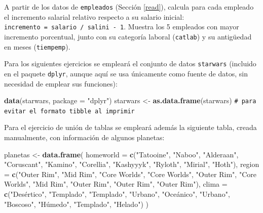 \documentclass[
]{book}
\newenvironment{Shaded}{\begin{snugshade}}{\end{snugshade}}
\newcommand{\AttributeTok}[1]{\textcolor[rgb]{0.13,0.29,0.53}{#1}}
\newcommand{\CommentTok}[1]{\textcolor[rgb]{0.56,0.35,0.01}{\textit{#1}}}
\newcommand{\FunctionTok}[1]{\textcolor[rgb]{0.13,0.29,0.53}{\textbf{#1}}}
\newcommand{\NormalTok}[1]{#1}
\newcommand{\OtherTok}[1]{\textcolor[rgb]{0.56,0.35,0.01}{#1}}
\newcommand{\StringTok}[1]{\textcolor[rgb]{0.31,0.60,0.02}{#1}}
\theoremstyle{break}
\theoremstyle{nonumberplain}
\renewcommand{\CommentTok}[1]{\textcolor[rgb]{0.41,0.41,0.41}{\texttt{#1}}}
\begin{document}
A partir de los datos de \texttt{empleados} (Sección \ref{read}), calcula para
cada empleado el incremento salarial relativo respecto a su salario inicial:
\texttt{incremento\ =\ salario\ /\ salini\ -\ 1}. Muestra los 5 empleados con mayor
incremento porcentual, junto con su categoría laboral (\texttt{catlab}) y su
antigüedad en meses (\texttt{tiempemp}).

Para los siguientes ejercicios se empleará el conjunto de datos \texttt{starwars}
(incluido en el paquete \texttt{dplyr}, aunque aquí se usa únicamente como fuente
de datos, sin necesidad de emplear sus funciones):

\begin{Shaded}
\begin{Highlighting}[]
\FunctionTok{data}\NormalTok{(starwars, }\AttributeTok{package =} \StringTok{"dplyr"}\NormalTok{)}
\NormalTok{starwars }\OtherTok{\textless{}{-}} \FunctionTok{as.data.frame}\NormalTok{(starwars) }\CommentTok{\# para evitar el formato tibble al imprimir}
\end{Highlighting}
\end{Shaded}

Para el ejercicio de unión de tablas se empleará además la siguiente tabla,
creada manualmente, con información de algunos planetas:

\begin{Shaded}
\begin{Highlighting}[]
\NormalTok{planetas }\OtherTok{\textless{}{-}} \FunctionTok{data.frame}\NormalTok{(}
  \AttributeTok{homeworld =} \FunctionTok{c}\NormalTok{(}\StringTok{"Tatooine"}\NormalTok{, }\StringTok{"Naboo"}\NormalTok{, }\StringTok{"Alderaan"}\NormalTok{, }\StringTok{"Coruscant"}\NormalTok{, }\StringTok{"Kamino"}\NormalTok{,}
                \StringTok{"Corellia"}\NormalTok{, }\StringTok{"Kashyyyk"}\NormalTok{, }\StringTok{"Ryloth"}\NormalTok{, }\StringTok{"Mirial"}\NormalTok{, }\StringTok{"Hoth"}\NormalTok{),}
  \AttributeTok{region    =} \FunctionTok{c}\NormalTok{(}\StringTok{"Outer Rim"}\NormalTok{, }\StringTok{"Mid Rim"}\NormalTok{, }\StringTok{"Core Worlds"}\NormalTok{, }\StringTok{"Core Worlds"}\NormalTok{, }\StringTok{"Outer Rim"}\NormalTok{,}
                \StringTok{"Core Worlds"}\NormalTok{, }\StringTok{"Mid Rim"}\NormalTok{, }\StringTok{"Outer Rim"}\NormalTok{, }\StringTok{"Outer Rim"}\NormalTok{, }\StringTok{"Outer Rim"}\NormalTok{),}
  \AttributeTok{clima     =} \FunctionTok{c}\NormalTok{(}\StringTok{"Desértico"}\NormalTok{, }\StringTok{"Templado"}\NormalTok{, }\StringTok{"Templado"}\NormalTok{, }\StringTok{"Urbano"}\NormalTok{, }\StringTok{"Oceánico"}\NormalTok{,}
                \StringTok{"Urbano"}\NormalTok{, }\StringTok{"Boscoso"}\NormalTok{, }\StringTok{"Húmedo"}\NormalTok{, }\StringTok{"Templado"}\NormalTok{, }\StringTok{"Helado"}\NormalTok{)}
\NormalTok{)}
\end{Highlighting}
\end{Shaded}
\end{document}
